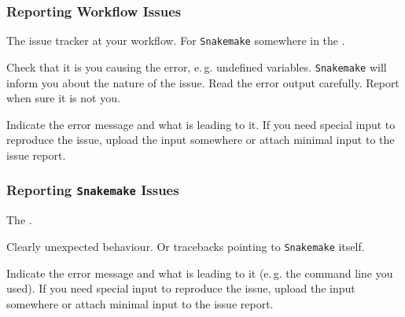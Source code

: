 \begin{frame}
	\frametitle{Reporting Workflow Issues}
	\begin{question}[Where to?]
		The issue tracker at your workflow. For \texttt{Snakemake} somewhere in the . 
	\end{question}
	\pause
	\begin{question}[What?]
	   Check that it is you causing the error, e.\,g. undefined variables. \texttt{Snakemake} will inform you about the nature of the issue. Read the error output carefully. Report when sure it is not you.
	\end{question}
	\pause
	\begin{question}[How?]
		Indicate the error message and what is leading to it. If you need special input to reproduce the issue, upload the input somewhere or attach minimal input to the issue report.
	\end{question}
\end{frame}

\begin{frame}
  \frametitle{Reporting \texttt{Snakemake} Issues}
  \begin{question}[Where to?]
  	 The .
  \end{question}	
  \pause
  \begin{question}[What?]
  	Clearly unexpected behaviour. Or tracebacks pointing to \texttt{Snakemake} itself. 
  \end{question}
  \pause
  \begin{question}[How?]
  	Indicate the error message and what is leading to it (e.\,g. the command line you used). If you need special input to reproduce the issue, upload the input somewhere or attach minimal input to the issue report.
  \end{question}
\end{frame}

